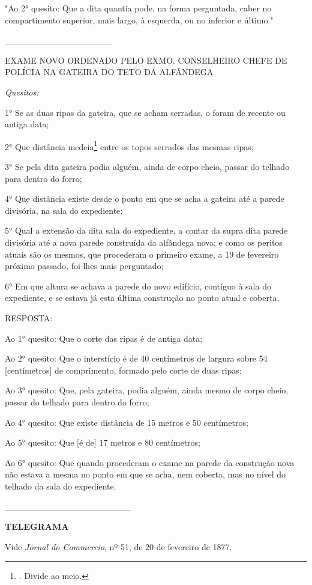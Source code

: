 "Ao 2° quesito: Que a dita quantia pode, na forma perguntada, caber no
compartimento superior, mais largo, à esquerda, ou no inferior e
último."

\_\_\_\_\_\_\_\_\_\_\_\_\_\_\_\_\_

EXAME NOVO ORDENADO PELO EXMO. CONSELHEIRO CHEFE DE POLÍCIA NA GATEIRA
DO TETO DA ALFÂNDEGA

\emph{Quesitos:}

1° Se as duas ripas da gateira, que se acham serradas, o foram de
recente ou antiga data;

2° Que distância medeia\footnote{. Divide ao meio.} entre os topos
serrados das mesmas ripas;

3° Se pela dita gateira podia alguém, ainda de corpo cheio, passar do
telhado para dentro do forro;

4° Que distância existe desde o ponto em que se acha a gateira até a
parede divisória, na sala do expediente;

5° Qual a extensão da dita sala do expediente, a contar da supra dita
parede divisória até a nova parede construída da alfândega nova; e como
os peritos atuais são os mesmos, que procederam o primeiro exame, a 19
de fevereiro próximo passado, foi-lhes mais perguntado;

6° Em que altura se achava a parede do novo edifício, contíguo à sala do
expediente, e se estava já esta última construção no ponto atual e
coberta.

RESPOSTA:

Ao 1° quesito: Que o corte das ripas é de antiga data;

Ao 2° quesito: Que o interstício é de 40 centímetros de largura sobre 54
{[}centímetros{]} de comprimento, formado pelo corte de duas ripas;

Ao 3° quesito: Que, pela gateira, podia alguém, ainda mesmo de corpo
cheio, passar do telhado para dentro do forro;

Ao 4° quesito: Que existe distância de 15 metros e 50 centímetros;

Ao 5° quesito: Que {[}é de{]} 17 metros e 80 centímetros;

Ao 6° quesito: Que quando procederam o exame na parede da construção
nova não estava a mesma no ponto em que se acha, nem coberta, mas no
nível do telhado da sala do expediente.

\_\_\_\_\_\_\_\_\_\_\_\_\_\_\_\_\_\_\_\_

\textbf{TELEGRAMA}

Vide \emph{Jornal do Commercio}, nº 51, de 20 de fevereiro de 1877.

